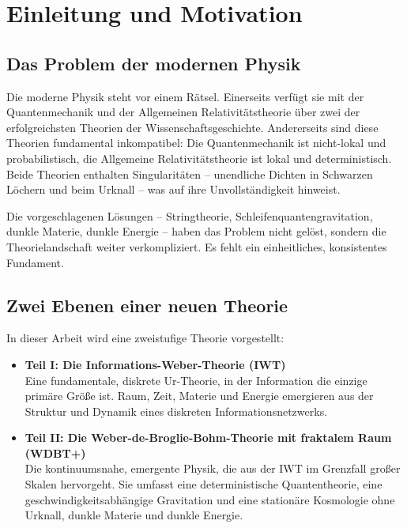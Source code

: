 
\chapter{Einleitung und Motivation}
\label{ch:einleitung}

\section{Das Problem der modernen Physik}
\label{sec:problem_der_modernen_physik}

Die moderne Physik steht vor einem Rätsel. Einerseits verfügt sie mit der Quantenmechanik und der Allgemeinen Relativitätstheorie über zwei der erfolgreichsten Theorien der Wissenschaftsgeschichte. Andererseits sind diese Theorien fundamental inkompatibel: Die Quantenmechanik ist nicht-lokal und probabilistisch, die Allgemeine Relativitätstheorie ist lokal und deterministisch. Beide Theorien enthalten Singularitäten – unendliche Dichten in Schwarzen Löchern und beim Urknall – was auf ihre Unvollständigkeit hinweist.

Die vorgeschlagenen Lösungen – Stringtheorie, Schleifenquantengravitation, dunkle Materie, dunkle Energie – haben das Problem nicht gelöst, sondern die Theorielandschaft weiter verkompliziert. Es fehlt ein einheitliches, konsistentes Fundament.

\section{Zwei Ebenen einer neuen Theorie}
\label{sec:zwei_ebenen}

In dieser Arbeit wird eine zweistufige Theorie vorgestellt:

\begin{itemize}
    \item \textbf{Teil I: Die Informations-Weber-Theorie (IWT)} \\
    Eine fundamentale, diskrete Ur-Theorie, in der Information die einzige primäre Größe ist. Raum, Zeit, Materie und Energie emergieren aus der Struktur und Dynamik eines diskreten Informationsnetzwerks.
    
    \item \textbf{Teil II: Die Weber-de-Broglie-Bohm-Theorie mit fraktalem Raum (WDBT+)} \\
    Die kontinuumsnahe, emergente Physik, die aus der IWT im Grenzfall großer Skalen hervorgeht. Sie umfasst eine deterministische Quantentheorie, eine geschwindigkeitsabhängige Gravitation und eine stationäre Kosmologie ohne Urknall, dunkle Materie und dunkle Energie.
\end{itemize}

